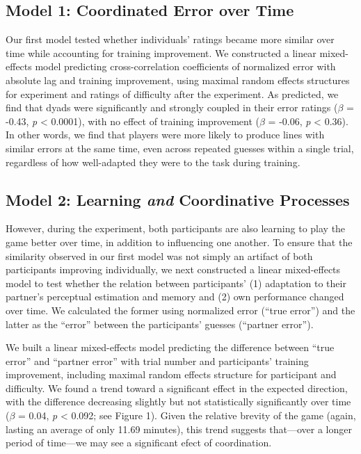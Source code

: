 \documentclass[10pt, letterpaper]{article}
\begin{document}
\subsection{Model 1: Coordinated Error over
Time}\label{model-1-coordinated-error-over-time}

Our first model tested whether individuals' ratings became more similar
over time while accounting for training improvement. We constructed a
linear mixed-effects model predicting cross-correlation coefficients of
normalized error with absolute lag and training improvement, using
maximal random effects structures for experiment and ratings of
difficulty after the experiment. As predicted, we find that dyads were
significantly and strongly coupled in their error ratings
(\emph{\(\beta\)} = -0.43, \emph{p} \textless{} 0.0001), with no effect
of training improvement (\emph{\(\beta\)} = -0.06, \emph{p} \textless{}
0.36). In other words, we find that players were more likely to produce
lines with similar errors at the same time, even across repeated guesses
within a single trial, regardless of how well-adapted they were to the
task during training.

\subsection{\texorpdfstring{Model 2: Learning \emph{and} Coordinative
Processes}{Model 2: Learning and Coordinative Processes}}\label{model-2-learning-and-coordinative-processes}

However, during the experiment, both participants are also learning to
play the game better over time, in addition to influencing one another.
To ensure that the similarity observed in our first model was not simply
an artifact of both participants improving individually, we next
constructed a linear mixed-effects model to test whether the relation
between participants' (1) adaptation to their partner's perceptual
estimation and memory and (2) own performance changed over time. We
calculated the former using normalized error (``true error'') and the
latter as the ``error'' between the participants' guesses (``partner
error'').

We built a linear mixed-effects model predicting the difference between
``true error'' and ``partner error'' with trial number and participants'
training improvement, including maximal random effects structure for
participant and difficulty. We found a trend toward a significant effect
in the expected direction, with the difference decreasing slightly but
not statistically significantly over time (\emph{\(\beta\)} = 0.04,
\emph{p} \textless{} 0.092; see Figure 1). Given the relative brevity of
the game (again, lasting an average of only 11.69 minutes), this trend
suggests that---over a longer period of time---we may see a significant
efect of coordination.
\end{document}
